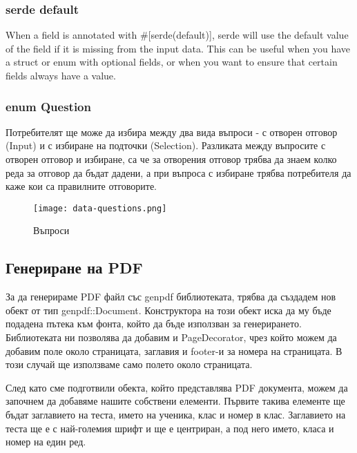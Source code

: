 \subsubsection{serde default}
When a field is annotated with \#[serde(default)], serde will use the default
value of the field if it is missing from the input data. This can be useful
when you have a struct or enum with optional fields, or when you want to ensure
that certain fields always have a value.


\subsubsection{enum Question}
Потребителят ще може да избира между два вида въпроси - с отворен отговор
(Input) и с избиране на подточки (Selection). Разликата между въпросите с
отворен отговор и избиране, са че за отворения отговор трябва да знаем колко
реда за отговор да бъдат дадени, а при въпроса с избиране трябва потребителя да
каже кои са правилните отговорите.

\begin{figure}[!htb]
  \texttt{[image: data-questions.png]}
  \centering
  \caption{Въпроси}
  \label{fig:data-questions}
\end{figure}

\subsection{Генериране на PDF}
За да генерираме PDF файл със genpdf библиотеката, трябва да създадем нов обект
от тип genpdf::Document. Конструктора на този обект иска да му бъде подадена
пътека към фонта, който да бъде използван за генерирането. Библиотеката ни
позволява да добавим и PageDecorator, чрез който можем да добавим поле около
страницата, заглавия и footer-и за номера на страницата. В този случай ще
използваме само полето около страницата.

След като сме подготвили обекта, който представлява PDF документа, можем да
започнем да добавяме нашите собствени елементи. Първите такива елементе ще
бъдат заглавието на теста, името на ученика, клас и номер в клас.
Заглавието на теста ще е с най-големия шрифт и ще е центриран, а под него
името, класа и номер на един ред.


